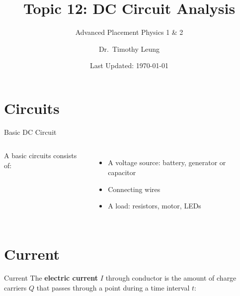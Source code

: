 \documentclass[12pt,aspectratio=169]{beamer}
\title{Topic 12: DC Circuit Analysis}
\subtitle{Advanced Placement Physics 1 \& 2}
\author[TML]{Dr.\ Timothy Leung}
\institute{Olympiads School}
\date{Last Updated: \today}
\newcommand{\eq}[2]{\vspace{#1}{\Large\begin{displaymath}#2\end{displaymath}}}
\begin{document}
\begin{frame}
  \maketitle
\end{frame}


\section{Circuits}

\begin{frame}{Basic DC Circuit}
  \begin{columns}
    \centering
    
    A basic circuits consists of:
    \begin{itemize}
    \item A voltage source: battery, generator or capacitor
    \item Connecting wires
    \item A load: resistors, motor, LEDs
    \end{itemize}
  \end{columns}
\end{frame}






\section{Current}

\begin{frame}{Current}
  The \textbf{electric current} $I$ through conductor is the amount of charge
  carriers $Q$ that passes through a point during a time interval $t$:

  \eq{-.2in}{
    \boxed{I=\frac{Q}t}
  }
\end{frame}
\end{document}
